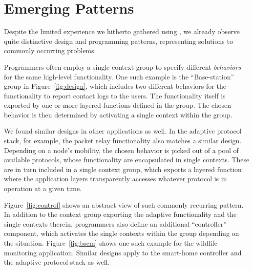\section{Emerging Patterns}
\label{sec:patterns}

Despite the limited experience we hitherto gathered using \conesc, we
already observe quite distinctive design and programming patterns,
representing solutions to commonly occurring problems. %


 Programmers often employ a single context
group to specify different \emph{behaviors} for the same high-level
functionality. One such example is the ``Base-station'' group in
Figure~\ref{fig:design}, which includes two different behaviors for
the functionality to report contact logs to the users. The
functionality itself is exported by one or more layered functions
defined in the group. The chosen behavior is then determined by
activating a single context within the group.

We found similar designs in other applications as well. In the
adaptive protocol stack, for example, the packet relay functionality
also matches a similar design. Depending on a node's mobility, the
chosen behavior is picked out of a pool of available protocols, whose
functionality are encapsulated in single contexts. These are in turn
included in a single context group, which exports a layered function
where the application layers transparently accesses whatever protocol
is in operation at a given time.


Figure~\ref{fig:control} shows an abstract view of such commonly
recurring pattern. In addition to the context group exporting the
adaptive functionality and the single contexts therein, programmers
also define an additional ``controller'' component, which activates
the single contexts within the group depending on the
situation. Figure~\ref{fig:bscm} shows one such example for the
wildlife monitoring application. Similar designs apply to the
smart-home controller and the adaptive protocol stack as well.

